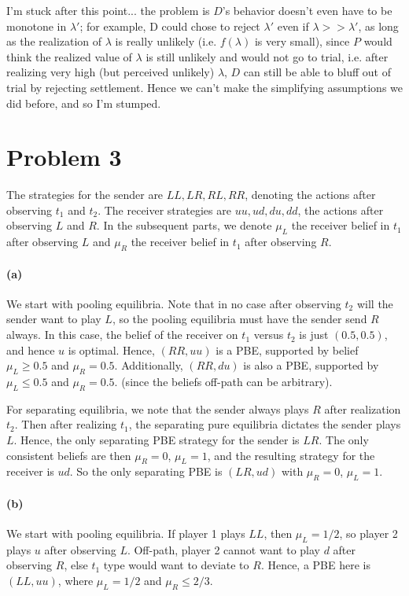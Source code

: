 \documentclass[10pt,letter]{article}
\begin{document}
\begin{enumerate}[label=(\alph*)]
  I'm stuck after this point... the problem is $D$'s behavior doesn't even have to be monotone in $\lambda'$; for example, D could chose to reject $\lambda'$ even if $\lambda >> \lambda'$, as long as the realization of $\lambda$ is really unlikely (i.e. $f(\lambda)$ is very small), since $P$ would think the realized value of $\lambda$ is still unlikely and would not go to trial, i.e. after realizing very high (but perceived unlikely) $\lambda$, $D$ can still be able to bluff out of trial by rejecting settlement. Hence we can't make the simplifying assumptions we did before, and so I'm stumped.
  \end{enumerate}
\section*{Problem 3}
The strategies for the sender are $LL, LR, RL, RR$, denoting the actions after observing $t_1$ and $t_2$. The receiver strategies are $uu, ud, du, dd$, the actions after observing $L$ and $R$. In the subsequent parts, we denote $\mu_L$ the receiver belief in $t_1$ after observing $L$ and $\mu_R$ the receiver belief in $t_1$ after observing $R$.
\paragraph*{(a)}
We start with pooling equilibria. Note that in no case after observing $t_2$ will the sender want to play $L$, so the pooling equilibria must have the sender send $R$ always. In this case, the belief of the receiver on $t_1$ versus $t_2$ is just $(0.5, 0.5)$, and hence $u$ is optimal. Hence, $(RR, uu)$ is a PBE, supported by belief $\mu_L \ge 0.5$ and $\mu_R = 0.5$. Additionally, $(RR, du)$  is also a PBE, supported by $\mu_L \le 0.5$ and $\mu_R = 0.5$. (since the beliefs off-path can be arbitrary).

For separating equilibria, we note that the sender always plays $R$ after realization $t_2$. Then after realizing $t_1$, the separating pure equilibria dictates the sender plays $L$. Hence, the only separating PBE strategy for the sender is $LR$. The only consistent beliefs are then $\mu_R = 0$, $\mu_L = 1$, and the resulting strategy for the receiver is $ud$. So the only separating PBE is $(LR, ud)$ with $\mu_R = 0$, $\mu_L = 1$.

\paragraph*{(b)}
We start with pooling equilibria. If player 1 plays $LL$, then $\mu_L = 1/2$, so player 2 plays $u$ after observing $L$. Off-path, player 2 cannot want to play $d$ after observing $R$, else $t_1$ type would want to deviate to $R$. Hence, a PBE here is $(LL, uu)$, where $\mu_L = 1/2$ and $\mu_R \le 2/3$.
\end{document}
